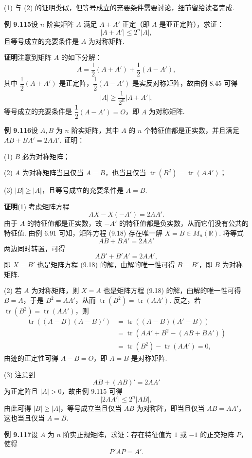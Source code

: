 \documentclass[UTF8, 12pt, fontset=fandol, oneside]{ctexart}
\begin{document}
(1) 与 (2) 的证明类似，但等号成立的充要条件需要讨论，细节留给读者完成.

\noindent\textbf{例 9.115}\quad 设 $n$ 阶实矩阵 $A$ 满足 $A+A'$ 正定（即 $A$ 是亚正定阵），求证：
\[
|A+A'|\le2^n|A|,
\]
且等号成立的充要条件是 $A$ 为对称矩阵.

\noindent\textbf{证明}\quad 注意到矩阵 $A$ 的如下分解：
\[
A=\frac{1}{2}(A+A')+\frac{1}{2}(A-A'),
\]
其中 $\dfrac{1}{2}(A+A')$ 是正定阵，$\dfrac{1}{2}(A-A')$ 是实反对称矩阵，故由例 8.45 可得
\[
|A|\ge \frac{1}{2^n}|A+A'|,
\]
等号成立的充要条件是 $\dfrac{1}{2}(A-A')=O$，即 $A$ 为对称矩阵.

\noindent\textbf{例 9.116}\quad 设 $A,B$ 为 $n$ 阶实矩阵，其中 $A$ 的 $n$ 个特征值都是正实数，并且满足 $AB+BA'=2AA'$. 证明：

(1) $B$ 必为对称矩阵；

(2) $A$ 为对称矩阵当且仅当 $A=B$，也当且仅当 $\operatorname{tr}(B^2)=\operatorname{tr}(AA')$；

(3) $|B|\ge |A|$，且等号成立的充要条件是 $A=B$.

\noindent\textbf{证明}\quad (1) 考虑矩阵方程
\begin{equation}
AX-X(-A')=2AA'.
\tag{9.18}
\end{equation}
由于 $A$ 的特征值都是正实数，故 $-A'$ 的特征值都是负实数，从而它们没有公共的特征值. 由例 6.91 可知，矩阵方程 (9.18) 存在唯一解 $X=B\in M_n(\mathbb{R})$. 将等式
\[
AB+BA'=2AA'
\]
两边同时转置，可得
\[
AB'+B'A'=2AA',
\]
即 $X=B'$ 也是矩阵方程 (9.18) 的解，由解的唯一性可得 $B=B'$，即 $B$ 为对称矩阵.

(2) 若 $A$ 为对称矩阵，则 $X=A$ 也是矩阵方程 (9.18) 的解，由解的唯一性可得 $B=A$，于是 $B^2=AA'$，从而 $\operatorname{tr}(B^2)=\operatorname{tr}(AA')$. 反之，若 $\operatorname{tr}(B^2)=\operatorname{tr}(AA')$，则
\[
\begin{aligned}
\operatorname{tr}((A-B)(A-B)')&=\operatorname{tr}((A-B)(A'-B))\\
&=\operatorname{tr}(AA'+B^2-(AB+BA'))\\
&=\operatorname{tr}(B^2)-\operatorname{tr}(AA')=0,
\end{aligned}
\]
由迹的正定性可得 $A-B=O$，即 $A=B$ 是对称矩阵.

(3) 注意到
\[
AB+(AB)'=2AA'
\]
为正定阵且 $|A|>0$，故由例 9.115 可得
\[
|2AA'|\le2^n|AB|,
\]
由此可得 $|B|\ge |A|$，等号成立当且仅当 $AB$ 为对称阵，即当且仅当 $AB=AA'$，这也当且仅当 $A=B$.

\noindent\textbf{例 9.117}\quad 设 $A$ 为 $n$ 阶实正规矩阵，求证：存在特征值为 $1$ 或 $-1$ 的正交矩阵 $P$，使得
\[
P'AP=A'.
\]
\end{document}
